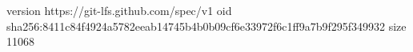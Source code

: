 version https://git-lfs.github.com/spec/v1
oid sha256:8411c84f4924a5782eeab14745b4b0b09cf6e33972f6c1ff9a7b9f295f349932
size 11068
